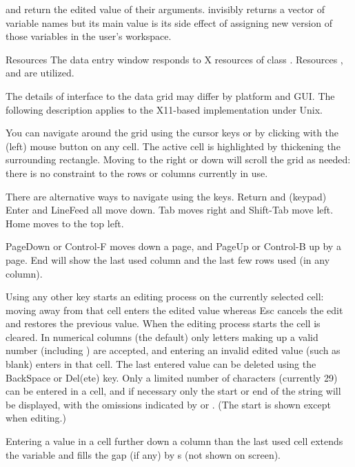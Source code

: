 %
\begin{Value}
 and  return the edited value of their
arguments.  invisibly returns a vector of variable
names but its main value is its side effect of assigning new version
of those variables in the user's workspace.
\end{Value}
%
\begin{Section}{Resources}
The data entry window responds to X resources of class
.  Resources ,  and
 are utilized.
\end{Section}
%
\begin{Note}\relax
The details of interface to the data grid may differ by platform and
GUI.  The following description applies to
the X11-based implementation under Unix.

You can navigate around the grid using the cursor keys or by clicking
with the (left) mouse button on any cell.  The active cell is
highlighted by thickening the surrounding rectangle.  Moving to the
right or down will scroll the grid as needed: there is no constraint
to the rows or columns currently in use.

There are alternative ways to navigate using the keys.  Return and
(keypad) Enter and LineFeed all move down. Tab moves right and
Shift-Tab move left.  Home moves to the top left.

PageDown or Control-F moves down a page, and PageUp or
Control-B up by a page.  End will show the last used column and the
last few rows used (in any column).

Using any other key starts an editing process on the currently
selected cell: moving away from that cell enters the edited value
whereas Esc cancels the edit and restores the previous value.  When
the editing process starts the cell is cleared.
In numerical columns
(the default) only letters making up a valid number (including
) are accepted, and entering an invalid edited value (such
as blank) enters  in that cell.  The last entered value can
be deleted using the  BackSpace or Del(ete) key.  Only a limited
number of characters (currently 29) can be entered in a cell, and if
necessary only the start or end of the string will be displayed, with the
omissions indicated by \code{>} or \code{<}.  (The start is shown
except when editing.)


Entering a value in a cell further down a column than the last used
cell extends the variable and fills the gap (if any) by s (not
shown on screen).


\end{Note}
